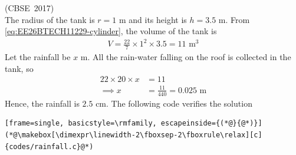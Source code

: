\begin{enumerate}[label=\thesubsection.\arabic*, ref=\thesubsection.\theenumi]
\hfill (CBSE~2017)
\\
\solution
The radius of the tank is $r = 1$ m and its height is $h = 3.5$ m. From \eqref{eq:EE26BTECH11229-cylinder}, the volume of the tank is
\begin{align}
	V = \frac{22}{7} \times 1^2 \times 3.5 = 11 \text{ m}^3
\end{align}
Let the rainfall be $x$ m. All the rain-water falling on the roof is collected in the tank, so
\begin{align}
	22 \times 20 \times x &= 11
	\\
	\implies x &= \frac{11}{440} = 0.025 \text{ m}
\end{align}
Hence, the rainfall is $2.5$ cm.
The following code verifies the solution
\begin{lstlisting}[frame=single, basicstyle=\rmfamily, escapeinside={(*@}{@*)}]
(*@\makebox[\dimexpr\linewidth-2\fboxsep-2\fboxrule\relax][c]{codes/rainfall.c}@*)
\end{lstlisting}


\end{enumerate}
